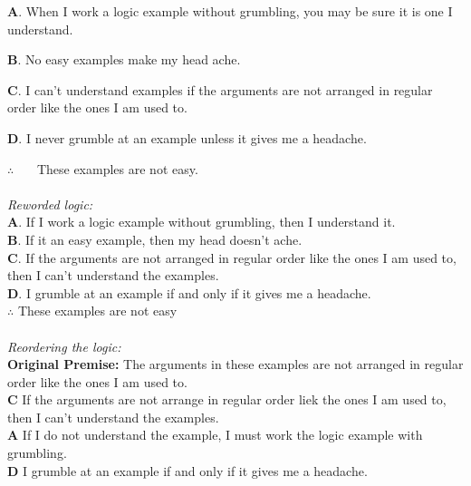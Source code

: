 \documentclass[11pt]{article}
\begin{document}
{\bf A}. When I work a logic example without grumbling, you may be sure it is one I understand.
\newline

{\bf B}. No easy examples make my head ache.
\newline

{\bf C}. I can't understand examples if the arguments are not arranged in regular order like the ones I am used to.
\newline

{\bf D}. I never grumble at an example unless it gives me a headache.
\newline

$\therefore$~~~ These examples are not easy.
\\\\

{\em Reworded logic:}\\

{\bf A}. If I work a logic example without grumbling, then I understand it.\\

{\bf B}. If it an easy example, then my head doesn't ache.\\

{\bf C}. If the arguments are not arranged in regular order like the ones I am used to, then I can't understand the examples.\\

{\bf D}. I grumble at an example if and only if it gives me a headache.\\

$\therefore$ These examples are not easy
\\\\

{\em Reordering the logic:}\\
{\bf Original Premise:} The arguments in these examples are not arranged in regular order like the ones I am used to.\\

{\bf C} If the arguments are not arrange in regular order liek the ones I am used to, then I can't understand the examples.\\

{\bf A} If I do not understand the example, I must work the logic example with grumbling.\\

{\bf D} I grumble at an example if and only if it gives me a headache.\\
\end{document}
